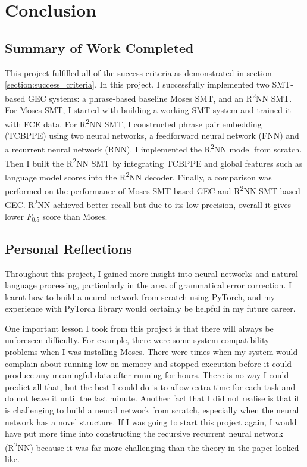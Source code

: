 \documentclass[12pt,a4paper,twoside,openright]{report}
\begin{document}
\chapter{Conclusion}

\section{Summary of Work Completed}
This project fulfilled all of the success criteria as demonstrated in section \ref{section:success_criteria}. In this project, I successfully implemented two SMT-based GEC systems: a phrase-based baseline Moses SMT, and an R\textsuperscript{2}NN SMT. For Moses SMT, I started with building a working SMT system and trained it with FCE data. For R\textsuperscript{2}NN SMT, I constructed phrase pair embedding (TCBPPE) using two neural networks, a feedforward neural network (FNN) and a recurrent neural network (RNN). I implemented the R\textsuperscript{2}NN model from scratch. Then I built the R\textsuperscript{2}NN SMT by integrating TCBPPE and global features such as language model scores into the R\textsuperscript{2}NN decoder. Finally, a comparison was performed on the performance of Moses SMT-based GEC and R\textsuperscript{2}NN SMT-based GEC. R\textsuperscript{2}NN achieved better recall but due to its low precision, overall it gives lower $F_{0.5}$ score than Moses. 

\section{Personal Reflections}
Throughout this project, I gained more insight into neural networks and natural language processing, particularly in the area of grammatical error correction. I learnt how to build a neural network from scratch using PyTorch, and my experience with PyTorch library would certainly be helpful in my future career. 

One important lesson I took from this project is that there will always be unforeseen difficulty. For example, there were some system compatibility problems when I was installing Moses. There were times when my system would complain about running low on memory and stopped execution before it could produce any meaningful data after running for hours. There is no way I could predict all that, but the best I could do is to allow extra time for each task and do not leave it until the last minute. Another fact that I did not realise is that it is challenging to build a neural network from scratch, especially when the neural network has a novel structure. If I was going to start this project again, I would have put more time into constructing the recursive recurrent neural network (R\textsuperscript{2}NN) because it was far more challenging than the theory in the paper\cite{r2nn} looked like.
\end{document}
